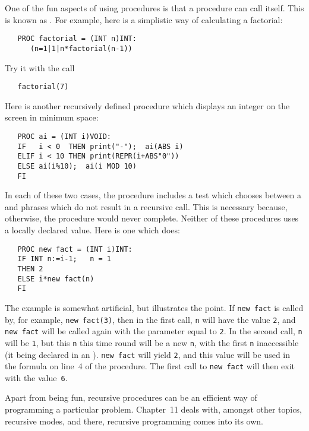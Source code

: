One of the fun aspects of using procedures is that a procedure can
call itself. This is known as . For example, here is
a simplistic way of calculating a factorial:
\begin{verbatim}
   PROC factorial = (INT n)INT:
      (n=1|1|n*factorial(n-1))
\end{verbatim}
\noindent
Try it with the call
\begin{verbatim}
   factorial(7)
\end{verbatim}
\noindent
Here is another recursively defined procedure which displays an
integer on the screen in minimum space:
\begin{verbatim}
   PROC ai = (INT i)VOID:
   IF   i < 0  THEN print("-");  ai(ABS i)
   ELIF i < 10 THEN print(REPR(i+ABS"0"))
   ELSE ai(i%10);  ai(i MOD 10)
   FI
\end{verbatim}
\noindent
In each of these two cases, the procedure includes a test which
chooses between a  and phrases
which do not result in a recursive call. This is necessary because,
otherwise, the procedure would never complete. Neither of these
procedures uses a locally declared value. Here is one which does:
\begin{verbatim}
   PROC new fact = (INT i)INT:
   IF INT n:=i-1;   n = 1
   THEN 2
   ELSE i*new fact(n)
   FI
\end{verbatim}
\noindent
The example is somewhat artificial, but illustrates the point. If
\verb|new fact| is called by, for example, \verb|new fact(3)|, then
in the first call, \verb|n| will have the value \verb|2|, and
\verb|new fact| will be called again with the parameter equal to
\verb|2|.  In the second call, \verb|n| will be \verb|1|, but this
\verb|n| this time round will be a new \verb|n|, with the first
\verb|n| inaccessible (it being declared in an ).
\verb|new fact| will yield \verb|2|, and this value will be used in
the formula on line~4 of the procedure.  The first call to
\verb|new fact| will then exit with the value~\verb|6|.

Apart from being fun, recursive procedures can be an efficient way of
programming a particular problem. Chapter~11 deals with, amongst other
topics, recursive modes, and there, recursive programming comes into
its own.

